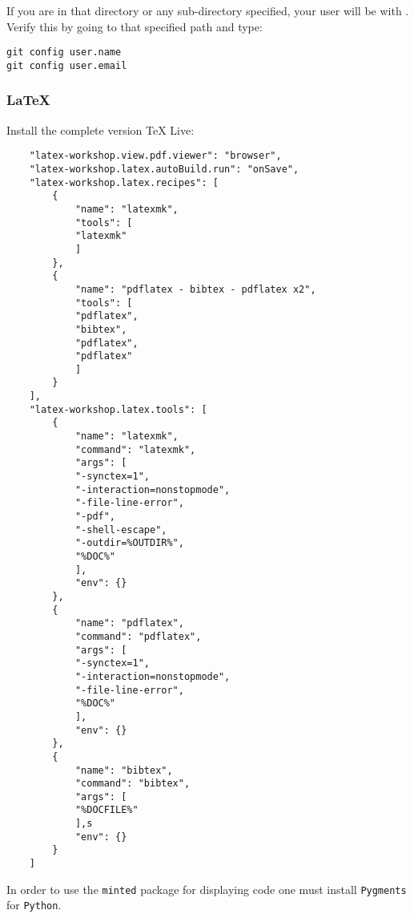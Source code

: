 If you are in that directory or any sub-directory specified, your user will be  with . Verify this by going to that specified path and type:

\begin{verbatim}
git config user.name
git config user.email
\end{verbatim}



\subsubsection{LaTeX}

Install the complete version TeX Live:



\begin{verbatim}
    "latex-workshop.view.pdf.viewer": "browser",
    "latex-workshop.latex.autoBuild.run": "onSave",
    "latex-workshop.latex.recipes": [
        {
            "name": "latexmk",
            "tools": [
            "latexmk"
            ]
        },
        {
            "name": "pdflatex - bibtex - pdflatex x2",
            "tools": [
            "pdflatex",
            "bibtex",
            "pdflatex",
            "pdflatex"
            ]
        }
    ],
    "latex-workshop.latex.tools": [
        {
            "name": "latexmk",
            "command": "latexmk",
            "args": [
            "-synctex=1",
            "-interaction=nonstopmode",
            "-file-line-error",
            "-pdf",
            "-shell-escape",
            "-outdir=%OUTDIR%",
            "%DOC%"
            ],
            "env": {}
        },
        {
            "name": "pdflatex",
            "command": "pdflatex",
            "args": [
            "-synctex=1",
            "-interaction=nonstopmode",
            "-file-line-error",
            "%DOC%"
            ],
            "env": {}
        },
        {
            "name": "bibtex",
            "command": "bibtex",
            "args": [
            "%DOCFILE%"
            ],s
            "env": {}
        }
    ]
\end{verbatim}

In order to use the \texttt{minted} package for displaying code one must install \texttt{Pygments} for \texttt{Python}.

